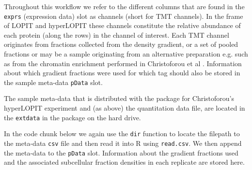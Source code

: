 Throughout this workflow we refer to the different columns that
are found in the \texttt{exprs} (expression data) slot as channels (short for TMT channels).
In the frame of LOPIT and hyperLOPIT these channels constitute the
relative abundance of each protein (along the rows) in the channel of
interest. Each TMT channel originates from fractions collected from
the density gradient, or a set of pooled fractions or may be a sample
originating from an alternative preparation e.g. such as from the
chromatin enrichment performed in Christoforou et al \cite{hyper}.
Information about which gradient fractions were used for which tag
should also be stored in the sample meta-data \texttt{pData} slot.

The sample meta-data that is distributed with the
 package for Christoforou's
hyperLOPIT experiment and (as above) the quantitation data file, are
located in the \texttt{extdata} in the 
package on the hard drive.

In the code chunk below we again use the
\texttt{dir} function to locate the filepath to the meta-data \texttt{csv} file and
then read it into R using \texttt{read.csv}. We then append the meta-data to
the \texttt{pData} slot.  Information about the gradient fractions used and
the associated subcellular fraction densities in %
each replicate are stored here.

